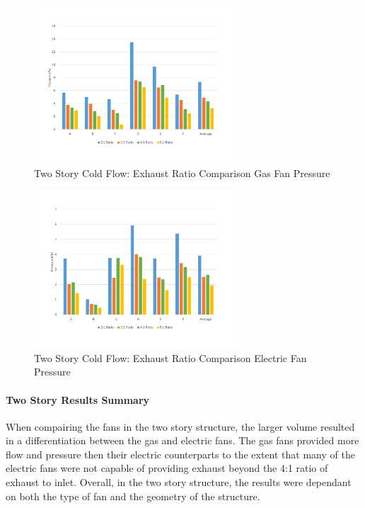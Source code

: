\documentclass{article}
\begin{document}
\begin{figure}[H]
	\centering
	\includegraphics[width=3in]{0_Images/ColdFlow/Two_Story/RatioPressureGas.pdf}
	\caption{Two Story Cold Flow: Exhaust Ratio Comparison Gas Fan Pressure}
	\label{fig:RatioPressure2StoryGas}
\end{figure}

\begin{figure}[H]
	\centering
	\includegraphics[width=3in]{0_Images/ColdFlow/Two_Story/RatioPressureEle.pdf}
	\caption{Two Story Cold Flow: Exhaust Ratio Comparison Electric Fan Pressure}
	\label{fig:RatioPressure2StoryEle}
\end{figure}

\paragraph{Two Story Results Summary} \mbox{}

When compairing the fans in the two story structure, the larger volume resulted in a differentiation between the gas and electric fans. The gas fans provided more flow and pressure then their electric counterparts to the extent that many of the electric fans were not capable of providing exhaust beyond the 4:1 ratio of exhaust to inlet. Overall, in the two story structure, the results were dependant on both the type of fan and the geometry of the structure.
\end{document}
